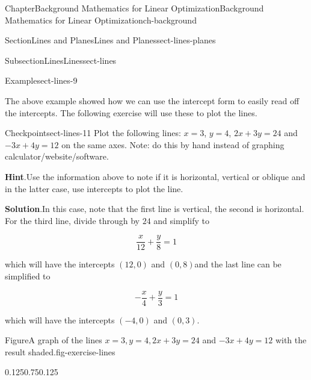 \documentclass[oneside,10pt,]{book}
\newcommand{\blocktitlefont}{\relax}
\numberwithin{equation}{section}
\begin{document}
\begin{chapterptx}{Chapter}{Background Mathematics for Linear Optimization}{}{Background Mathematics for Linear Optimization}{}{}{ch-background}
\begin{sectionptx}{Section}{Lines and Planes}{}{Lines and Planes}{}{}{sect-lines-planes}
\begin{subsectionptx}{Subsection}{Lines}{}{Lines}{}{}{sect-lines}
\begin{example}{Example}{}{sect-lines-9}
\end{example}
The above example showed how we can use the intercept form to easily read off the intercepts. The following exercise will use these to plot the lines.%
\begin{inlineexercise}{Checkpoint}{}{sect-lines-11}%
Plot the following lines: \(x=3\), \(y= 4\), \(2x+ 3y = 24\) and \(-3x+4y = 12\) on the same axes. Note: do this by hand instead of graphing calculator\slash{}website\slash{}software.%
\par\smallskip%
\noindent\textbf{\blocktitlefont Hint}.\hypertarget{sect-lines-11-2}{}\quad{}Use the information above to note if it is horizontal, vertical or oblique and in the latter case, use intercepts to plot the line.%
\par\smallskip%
\noindent\textbf{\blocktitlefont Solution}.\hypertarget{sect-lines-11-3}{}\quad{}In this case, note that the first line is vertical, the second is horizontal. For the third line, divide through by \(24\) and simplify to%
\par
%
\begin{equation*}
\frac{x}{12} + \frac{y}{8} = 1
\end{equation*}
%
\par
which will have the intercepts \((12,0)\) and \((0,8)\)and the last line can be simplified to%
\par
%
\begin{equation*}
-\frac{x}{4} + \frac{y}{3} = 1
\end{equation*}
%
\par
which will have the intercepts \((-4,0)\) and \((0,3)\).%
\begin{figureptx}{Figure}{A graph of the lines \(x=3, y=4, 2x+3y=24\) and \(-3x+4y = 12\) with the result shaded.}{fig-exercise-lines}{}%
\begin{image}{0.125}{0.75}{0.125}{}%
\end{image}
\end{figureptx}
\end{inlineexercise}
\end{subsectionptx}
\end{sectionptx}
\end{chapterptx}
\end{document}
